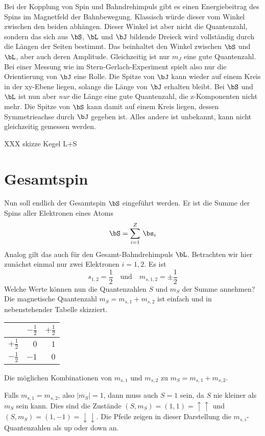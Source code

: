 Bei der Kopplung von Spin und Bahndrehimpuls gibt es einen Energiebeitrag des Spins im Magnetfeld der Bahnbewegung. Klassisch würde dieser vom Winkel zwischen den beiden abhängen. Dieser Winkel ist aber nicht die Quantenzahl, sondern das sich aus $\bS$, $\bL$ und $\bJ$ bildende Dreieck wird vollständig durch die Längen der Seiten bestimmt. Das beinhaltet den Winkel zwischen $\bS$ und $\bL$, aber auch deren Amplitude. Gleichzeitig ist nur $m_J$ eine gute Quantenzahl. Bei einer Messung wie im Stern-Gerlach-Experiment spielt also nur die Orientierung von $\bJ$ eine Rolle. Die Spitze von $\bJ$ kann wieder auf einem Kreis in der xy-Ebene liegen, solange die Länge von $\bJ$ erhalten bleibt. Bei $\bS$ und $\bL$ ist nun aber \emph{nur} die Länge eine gute Quantenzahl, die z-Komponenten nicht mehr. Die Spitze von $\bS$ kann damit auf einem Kreis liegen, dessen Symmetrieachse durch $\bJ$ gegeben ist. Alles andere ist unbekannt, kann nicht gleichzeitig gemessen werden. %

XXX skizze Kegel L+S




\section{Gesamtspin}

Nun soll endlich der Gesamtspin $\bS$ eingeführt werden. Er ist die Summe der Spins aller Elektronen eines Atoms
\begin{equation}
    \bS = \sum_{i=1}^Z \, \bs_i \label{eq:6_S_sum}
\end{equation}
Analog gilt das auch für den Gesamt-Bahndrehimpuls $\bL$. Betrachten wir hier zunächst einmal nur zwei Elektronen $i =1, 2$. Es ist 
\begin{equation}
s_{1,2} = \frac{1}{2} \quad \text{und} \quad m_{s,1,2} = \pm \frac{1}{2} 
\end{equation}
Welche Werte können nun die Quantenzahlen  $S$ und $m_S$ der Summe annehmen? Die magnetische Quantenzahl $m_S  = m_{s,1} + m_{s,2}$ ist einfach und in nebenstehender Tabelle skizziert.
%
\begin{marginfigure}
\begin{tabular}{r|rr}
                           & $-\frac{1}{2} $  & $+\frac{1}{2} $ \\
                           \hline
 $+\frac{1}{2} $    &     $0$              & $1$ \\
 $-\frac{1}{2} $    &     $-1$              & $0$ 
\end{tabular}
\caption{Die möglichen Kombinationen von $m_{s,1}$ und $m_{s,2}$ zu $m_S  = m_{s,1} + m_{s,2}$.}
\end{marginfigure}
%
Falls $m_{s,1} = m_{s,2}$, also $|m_S| = 1$, dann muss auch $S = 1$ sein, da $S$ nie kleiner als $m_S$ sein kann. Dies sind die Zustände  $(S, m_S) = (1,1) = \uparrow\uparrow$ und  $(S, m_S) = (1,-1) = \downarrow\downarrow$. Die Pfeile zeigen in dieser Darstellung die  $m_{s,i}$-Quantenzahlen als up oder down an.

